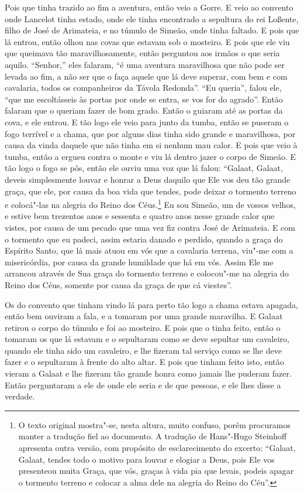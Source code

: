 Pois que tinha trazido ao fim a aventura, então veio a Gorre. E veio ao convento
onde Lancelot tinha estado, onde ele tinha encontrado a sepultura do rei
Loßente, filho de José de Arimateia, e no túmulo de Simeão, onde tinha faltado.
E pois que lá entrou, então olhou nas covas que estavam sob o mosteiro. E pois
que ele viu que queimava tão maravilhosamente, então perguntou aos irmãos o que
seria aquilo. “Senhor,” eles falaram, “é uma aventura maravilhosa que não pode
ser levada ao fim, a não ser que o faça aquele que lá deve superar, com bem e
com cavalaria, todos os companheiros da Távola Redonda”. “Eu queria”, falou
ele, “que me escoltásseis às portas por onde se entra, se vos for do agrado”.
Então falaram que o queriam fazer de bom grado. Então o guiaram até as portas
da cova, e ele entrou. E tão logo ele veio para junto da tumba, então se
puseram o fogo terrível e a chama, que por alguns dias tinha sido grande e
maravilhosa, por causa da vinda daquele que não tinha em si nenhum mau calor. E
pois que veio à tumba, então a ergueu contra o monte e viu lá dentro jazer o
corpo de Simeão. E tão logo o fogo se pôs, então ele ouviu uma voz que lá
falou: “Galaat, Galaat, deveis simplesmente louvar e honrar a Deus daquilo que
Ele vos deu tão grande graça, que ele, por causa da boa vida que tendes, pode
deixar o tormento terreno e colocá"-las na alegria do Reino dos Céus.\footnote{
O texto original mostra"-se, nesta altura, muito confuso, porém procuramos
manter a tradução fiel ao documento. A tradução de Hans"-Hugo Steinhoff
apresenta outra versão, com propósito de esclarecimento do excerto: “Galaat,
Galaat, tendes todo o motivo para louvar e elogiar a Deus, pois Ele vos
presenteou muita Graça, que vós, graças à vida pia que levais, podeis apagar o
tormento terreno e colocar a alma dele na alegria do Reino do Céu”.} 
Eu sou Simeão, um de vossos velhos, e estive bem trezentos anos e sessenta e
quatro anos nesse grande calor que vistes, por causa de um pecado que uma vez
fiz contra José de Arimateia. E com o tormento que eu padeci, assim estaria
danado e perdido, quando a graça do Espírito Santo, que lá mais atuou em vós
que a cavalaria terrena, viu"-me com a misericórdia, por causa da grande
humildade que há em vós. Assim Ele me arrancou através de Sua graça do tormento
terreno e colocou"-me na alegria do Reino dos Céus, somente por causa da graça
de que cá viestes”.

Os do convento que tinham vindo lá para perto tão logo a chama estava apagada,
então bem ouviram a fala, e a tomaram por uma grande maravilha. E Galaat
retirou o corpo do túmulo e foi ao mosteiro. E pois que o tinha feito, então o
tomaram os que lá estavam e o sepultaram como se deve sepultar um cavaleiro,
quando ele tinha sido um cavaleiro, e lhe fizeram tal serviço como se lhe deve
fazer e o sepultaram à frente do alto altar. E pois que tinham feito
isto, então vieram a Galaat e lhe fizeram tão grande honra como jamais lhe
puderam fazer. Então perguntaram a ele de onde ele seria e de que
pessoas, e ele lhes disse a verdade.

